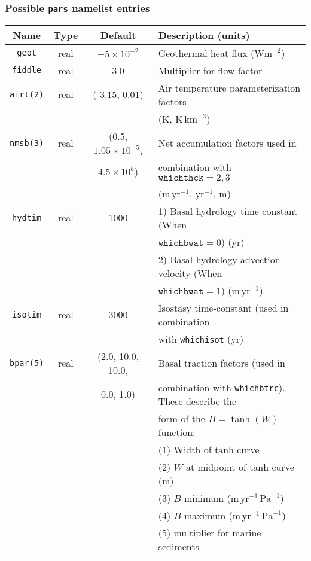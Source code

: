 \subsubsection{Possible \texttt{pars} namelist entries}
%
\begin{center}
\begin{tabular}{|c|c|c|l|}
\hline
Name & Type & Default & Description (units)\\
\hline
\hline
\texttt{geot} & real & $-5\times 10^{-2}$ & Geothermal heat flux
($\mathrm{Wm}^{-2}$) \\
\hline
\texttt{fiddle} & real & 3.0 & Multiplier for flow factor \\
\hline
\texttt{airt(2)} & real & (-3.15,-0.01) & Air temperature parameterization
factors \\
 & & & (K, $\mathrm{K}\,\mathrm{km}^{-3}$) \\
\hline
\texttt{nmsb(3)} & real & (0.5, $1.05\times 10^{-5}$,  & Net accumulation
factors used in \\
 & & $4.5\times 10^{5}$) & combination with $\mathtt{whichthck}=2,3$ \\
 & & & ($\mathrm{m}\,\mathrm{yr}^{-1}$, $\mathrm{yr}^{-1}$, m) \\
\hline
\texttt{hydtim} & real & 1000 & 1) Basal hydrology time constant (When \\
 & & & $\mathtt{whichbwat}=0$) (yr)\\
 & & & 2) Basal hydrology advection velocity (When \\
 & & & $\mathtt{whichbwat}=1$) ($\mathrm{m}\,\mathrm{yr}^{-1}$)\\
\hline
\texttt{isotim} & real & 3000 & Isostasy time-constant (used in combination \\
 & & & with \texttt{whichisot} (yr) \\
\hline 
\texttt{bpar(5)} & real & (2.0, 10.0, 10.0, & Basal traction factors (used in \\
 & & 0.0, 1.0) & combination with \texttt{whichbtrc}). These describe the \\
 & & & form of the $B=\tanh(W)$ function: \\
 & & & (1) Width of tanh curve \\
 & & & (2) $W$ at midpoint of tanh curve (m) \\
 & & & (3) $B$ minimum ($\mathrm{m}\,\mathrm{yr}^{-1}\,\mathrm{Pa}^{-1}$) \\
 & & & (4) $B$ maximum ($\mathrm{m}\,\mathrm{yr}^{-1}\,\mathrm{Pa}^{-1}$) \\
 & & & (5) multiplier for marine sediments \\
\hline
\end{tabular}
\end{center}
%
